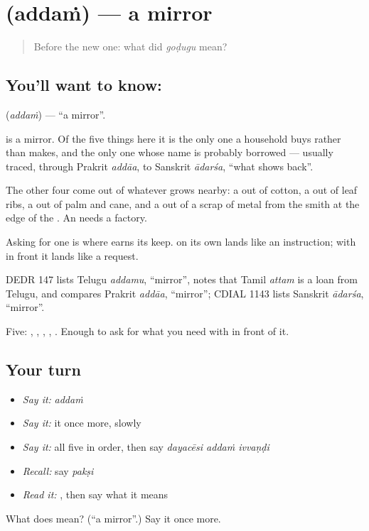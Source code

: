 \section[\texorpdfstring{\te{అద్దం} (addaṁ)}{అద్దం (addaṁ)}]{ (addaṁ) — a mirror}

\label{lesson:TE-C62-mirror}



\begin{quote}
Before the new one: what did \emph{goḍugu} mean?
\end{quote}

\subsection*{You'll want to know: }
\textbf{} (\emph{addaṁ}) — \textquotedblleft{}a mirror\textquotedblright{}.

 is a mirror. Of the five things here it is the only one a household buys rather than makes, and the only one whose name is probably borrowed — usually traced, through Prakrit \emph{addāa}, to Sanskrit \emph{ādarśa}, \textquotedblleft{}what shows back\textquotedblright{}.

The other four come out of whatever grows nearby: a  out of cotton, a  out of leaf ribs, a  out of palm and cane, and a  out of a scrap of metal from the smith at the edge of the . An  needs a factory.

Asking for one is where  earns its keep.   on its own lands like an instruction; with  in front it lands like a request.

DEDR 147 lists Telugu \emph{addamu}, \textquotedblleft{}mirror\textquotedblright{}, notes that Tamil \emph{attam} is a loan from Telugu, and compares Prakrit \emph{addāa}, \textquotedblleft{}mirror\textquotedblright{}; CDIAL 1143 lists Sanskrit \emph{ādarśa}, \textquotedblleft{}mirror\textquotedblright{}.

\begin{grammarlens}[title={What you've built}]
Five: , , , , . Enough to ask for what you need with  in front of it.
\end{grammarlens}

\subsection*{Your turn}
\begin{itemize}
\raggedright
  \item \emph{Say it:} \emph{addaṁ}
  \item \emph{Say it:} it once more, slowly
  \item \emph{Say it:} all five in order, then say \emph{dayacēsi addaṁ ivvaṇḍi}
  \item \emph{Recall:} say \emph{pakṣi}
  \item \emph{Read it:} \textbf{}, then say what it means
\end{itemize}

\begin{tcolorbox}[breakable,colback=teal!4,colframe=teal!35!black,title={Before you move on}]
What does  mean? (\textquotedblleft{}a mirror\textquotedblright{}.) Say it once more.
\end{tcolorbox}
